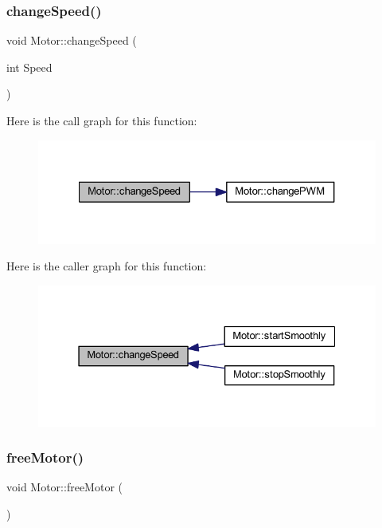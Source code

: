 \subsubsection{\texorpdfstring{change\+Speed()}{changeSpeed()}}
{\footnotesize\ttfamily void Motor\+::change\+Speed (\begin{DoxyParamCaption}\item[{int}]{Speed }\end{DoxyParamCaption})}

Here is the call graph for this function\+:\nopagebreak
\begin{figure}[H]
\begin{center}
\leavevmode
\includegraphics[width=327pt]{class_motor_a6b966366a7a184ae6b3c3227f5d57213_cgraph}
\end{center}
\end{figure}
Here is the caller graph for this function\+:\nopagebreak
\begin{figure}[H]
\begin{center}
\leavevmode
\includegraphics[width=331pt]{class_motor_a6b966366a7a184ae6b3c3227f5d57213_icgraph}
\end{center}
\end{figure}
\mbox{\label{class_motor_a76845764c398bb11a880080b010e6119}} 
\subsubsection{\texorpdfstring{free\+Motor()}{freeMotor()}}
{\footnotesize\ttfamily void Motor\+::free\+Motor (\begin{DoxyParamCaption}{ }\end{DoxyParamCaption})}

